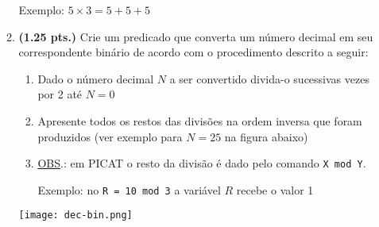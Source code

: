 \documentclass[a4paper,11pt]{article}
\begin{document}
\begin{enumerate}
\begin{enumerate}
   Exemplo: $5 \times 3 = 5 + 5 + 5$

	\item {\bf (1.25 pts.)} Crie um predicado que converta um número decimal em seu correspondente binário de acordo com o procedimento descrito 
	a seguir:
		\begin{enumerate}
		\item Dado o número decimal $N$ a ser convertido divida-o sucessivas vezes por 2 até $N=0$
		\item Apresente todos os restos das divisões na ordem inversa que foram produzidos (ver exemplo para $N=25$ na figura abaixo)
		\item \underline{OBS}.: em PICAT o resto da divisão é dado pelo comando {\tt X mod Y}. 
		
		Exemplo: no {\tt R = 10 mod 3} a variável $R$ recebe o valor 1
		\end{enumerate}
 
	\begin{center}\texttt{[image: dec-bin.png]}\end{center}
\end{enumerate}

\end{enumerate}

\begin{comment}
  \item  Algo como ....:
  $$ 
  \operatorname{fact}(n) =
 \begin{cases}
  1 & \mbox{if } n = 0 \\
  n \cdot \operatorname{fact}(n-1) & \mbox{se } n > 0 \\
 \end{cases}
$$
   \end{comment}
\end{document}
